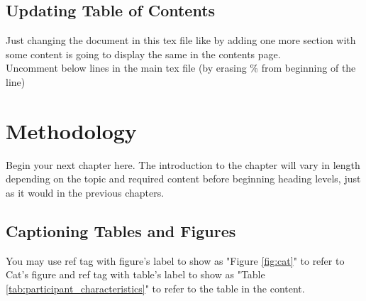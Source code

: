 \documentclass[12pt]{report}
\begin{document}
\section{Updating Table of Contents}
Just changing the document in this tex file like by adding one more section with some content is going to display the same in the contents page. 
\\
Uncomment below lines in the main tex file (by erasing \% from beginning of the line)


\chapter{Methodology}
Begin your next chapter here. The introduction to the chapter will vary in length depending on the topic and required content before beginning heading levels, just as it would in the previous chapters.


\section{Captioning Tables and Figures}
You may use ref tag with figure's label to show as "Figure \ref{fig:cat}" to refer to Cat's figure and ref tag with table's label to show as "Table \ref{tab:participant_characteristics}" to refer to the table in the content.
\end{document}
